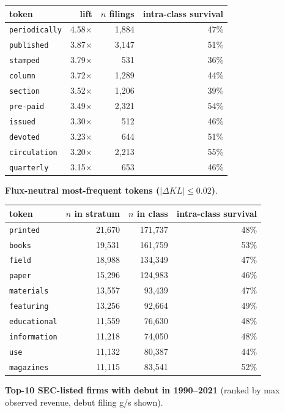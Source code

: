 \begin{tabular}{lrrr}
\toprule
token & lift & $n$ filings & intra-class survival \\
\midrule
\texttt{periodically} & 4.58$\times$ & 1,884 & 47\% \\
\texttt{published} & 3.87$\times$ & 3,147 & 51\% \\
\texttt{stamped} & 3.79$\times$ & 531 & 36\% \\
\texttt{column} & 3.72$\times$ & 1,289 & 44\% \\
\texttt{section} & 3.52$\times$ & 1,206 & 39\% \\
\texttt{pre-paid} & 3.49$\times$ & 2,321 & 54\% \\
\texttt{issued} & 3.30$\times$ & 512 & 46\% \\
\texttt{devoted} & 3.23$\times$ & 644 & 51\% \\
\texttt{circulation} & 3.20$\times$ & 2,213 & 55\% \\
\texttt{quarterly} & 3.15$\times$ & 653 & 46\% \\
\bottomrule
\end{tabular}

\textbf{Flux-neutral most-frequent tokens ($|\Delta KL|\leq 0.02$)}.

\begin{tabular}{lrrr}
\toprule
token & $n$ in stratum & $n$ in class & intra-class survival \\
\midrule
\texttt{printed} & 21,670 & 171,737 & 48\% \\
\texttt{books} & 19,531 & 161,759 & 53\% \\
\texttt{field} & 18,988 & 134,349 & 47\% \\
\texttt{paper} & 15,296 & 124,983 & 46\% \\
\texttt{materials} & 13,557 & 93,439 & 47\% \\
\texttt{featuring} & 13,256 & 92,664 & 49\% \\
\texttt{educational} & 11,559 & 76,630 & 48\% \\
\texttt{information} & 11,218 & 74,050 & 48\% \\
\texttt{use} & 11,132 & 80,387 & 44\% \\
\texttt{magazines} & 11,115 & 83,541 & 52\% \\
\bottomrule
\end{tabular}

\textbf{Top-10 SEC-listed firms with debut in 1990--2021} (ranked by max observed revenue, debut filing g/s shown).

